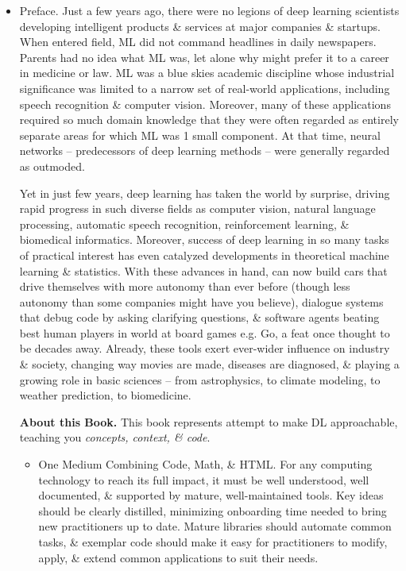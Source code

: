 \documentclass{article}
\begin{document}
\begin{enumerate}
\begin{itemize}
		\item {\sf Preface.} Just a few years ago, there were no legions of deep learning scientists developing intelligent products \& services at major companies \& startups. When entered field, ML did not command headlines in daily newspapers. Parents had no idea what ML was, let alone why might prefer it to a career in medicine or law. ML was a blue skies academic discipline whose industrial significance was limited to a narrow set of real-world applications, including speech recognition \& computer vision. Moreover, many of these applications required so much domain knowledge that they were often regarded as entirely separate areas for which ML was 1 small component. At that time, neural networks -- predecessors of deep learning methods -- were generally regarded as outmoded.
		
		Yet in just few years, deep learning has taken the world by surprise, driving rapid progress in such diverse fields as computer vision, natural language processing, automatic speech recognition, reinforcement learning, \& biomedical informatics. Moreover, success of deep learning in so many tasks of practical interest has even catalyzed developments in theoretical machine learning \& statistics. With these advances in hand, can now build cars that drive themselves with more autonomy than ever before (though less autonomy than some companies might have you believe), dialogue systems that debug code by asking clarifying questions, \& software agents beating best human players in world at board games e.g. Go, a feat once thought to be decades away. Already, these tools exert ever-wider influence on industry \& society, changing way movies are made, diseases are diagnosed, \& playing a growing role in basic sciences -- from astrophysics, to climate modeling, to weather prediction, to biomedicine.
		
		{\bf About this Book.} This book represents attempt to make DL approachable, teaching you {\it concepts, context, \& code}.
		\begin{itemize}
			\item {\sf One Medium Combining Code, Math, \& HTML.} For any computing technology to reach its full impact, it must be well understood, well documented, \& supported by mature, well-maintained tools. Key ideas should be clearly distilled, minimizing onboarding time needed to bring new practitioners up to date. Mature libraries should automate common tasks, \& exemplar code should make it easy for practitioners to modify, apply, \& extend common applications to suit their needs.
			

\end{itemize}
\end{itemize}
\end{enumerate}
\end{document}
